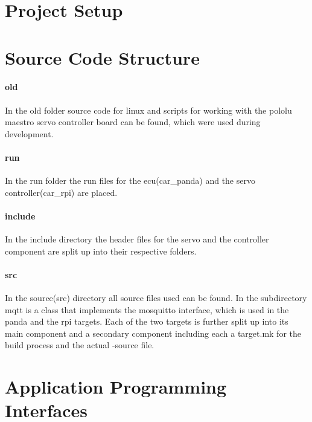 \section{Project Setup}


\section{Source Code Structure}
\paragraph{old}
In the old folder source code for linux and scripts for working with the pololu maestro servo controller board can be found, which were used during development.

\paragraph{run}
In the run folder the run files for the ecu(car\_panda) and the servo controller(car\_rpi) are placed.

\paragraph{include}
In the include directory the header files for the servo and the controller component are split up into their respective folders.

\paragraph{src}
In the source(src) directory all source files used can be found. In the subdirectory mqtt is a class that implements the mosquitto interface, which is used in the panda and the rpi targets. Each of the two targets is further split up into its main component and a secondary component including each a target.mk for the build process and the actual \CC-source file.

\section{Application Programming Interfaces}
